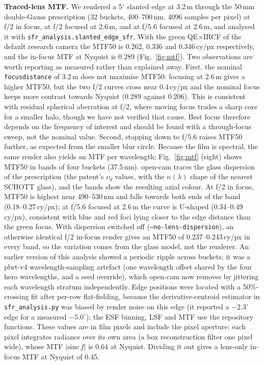 \documentclass[letterpaper,twocolumn,fleqn]{article}
\newcommand{\mtfFoc}{0.262}
\newcommand{\mtfDefTwo}{0.336}
\newcommand{\mtfDefFive}{0.346}
\newcommand{\mtfNyqDefTwo}{0.206}
\newcommand{\mtfNyqFoc}{0.289}
\newcommand{\mtfNyqLensFoc}{0.45}
\newcommand{\mtfBandFoc}{0.18--0.27}
\newcommand{\mtfBandFive}{0.34--0.49}
\begin{document}
\textbf{Traced-lens MTF.} We rendered a 5$^\circ$ slanted edge at 3.2\,m through the 50\,mm double-Gauss prescription (32 buckets, 400--700\,nm, 4096 samples per pixel) at f/2 in focus, at f/2 focused at 2.6\,m, and at f/5.6 focused at 2.6\,m, and analysed it with \texttt{sfr\_analysis.slanted\_edge\_sfr}. With the green QE$\times$IRCF of the default research camera the MTF50 is \mtfFoc, \mtfDefTwo{} and \mtfDefFive{}\,cy/px respectively, and the in-focus MTF at Nyquist is \mtfNyqFoc{} (Fig.~\ref{fig:mtf}). Two observations are worth reporting as measured rather than explained away. First, the nominal \texttt{focusdistance} of 3.2\,m does not maximise MTF50: focusing at 2.6\,m gives a higher MTF50, but the two f/2 curves cross near 0.4\,cy/px and the nominal focus keeps more contrast towards Nyquist (\mtfNyqFoc{} against \mtfNyqDefTwo{}). This is consistent with residual spherical aberration at f/2, where moving focus trades a sharp core for a smaller halo, though we have not verified that cause. Best focus therefore depends on the frequency of interest and should be found with a through-focus sweep, not the nominal value. Second, stopping down to f/5.6 raises MTF50 further, as expected from the smaller blur circle. Because the film is spectral, the same render also yields an MTF per wavelength; Fig.~\ref{fig:mtf} (right) shows MTF50 in bands of four buckets (37.5\,nm). open-cam traces the glass dispersion of the prescription (the patent's $\nu_d$ values, with the $n(\lambda)$ shape of the nearest SCHOTT glass), and the bands show the resulting axial colour. At f/2 in focus, MTF50 is highest near 490--530\,nm and falls towards both ends of the band (\mtfBandFoc\,cy/px); at f/5.6 focused at 2.6\,m the curve is U-shaped (\mtfBandFive\,cy/px), consistent with blue and red foci lying closer to the edge distance than the green focus. With dispersion switched off (\texttt{--no-lens-dispersion}), an otherwise identical f/2 in-focus render gives an MTF50 of 0.237--0.243\,cy/px in every band, so the variation comes from the glass model, not the renderer. An earlier version of this analysis showed a periodic ripple across buckets; it was a pbrt-v4 wavelength-sampling artefact (one wavelength offset shared by the four hero wavelengths, and a seed override), which open-cam now removes by jittering each wavelength stratum independently. Edge positions were located with a 50\%-crossing fit after per-row flat-fielding, because the derivative-centroid estimator in \texttt{sfr\_analysis.py} was biased by render noise on this edge (it reported a $-2.3^\circ$ edge for a measured $-5.0^\circ$); the ESF binning, LSF and MTF use the repository functions. These values are in film pixels and include the pixel aperture: each pixel integrates radiance over its own area (a box reconstruction filter one pixel wide), whose MTF $|\mathrm{sinc}\,f|$ is 0.64 at Nyquist. Dividing it out gives a lens-only in-focus MTF at Nyquist of \mtfNyqLensFoc{}.
\end{document}
